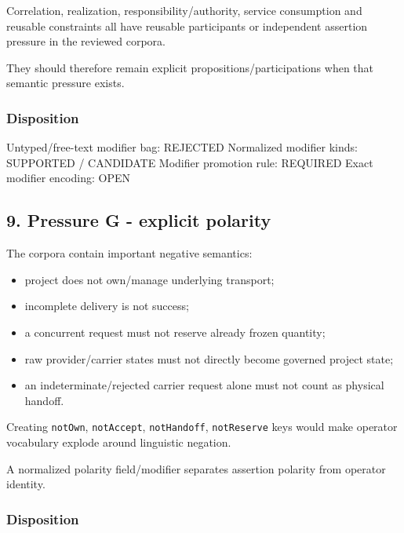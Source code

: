 \documentclass[
  10pt,
  letterpaper,
]{article}
\newenvironment{Shaded}{}{}
\newcommand{\NormalTok}[1]{#1}
\providecommand{\tightlist}{%
  \setlength{\itemsep}{0pt}\setlength{\parskip}{0pt}}
\begin{document}
Correlation, realization, responsibility/authority, service consumption
and reusable constraints all have reusable participants or independent
assertion pressure in the reviewed corpora.

They should therefore remain explicit propositions/participations when
that semantic pressure exists.

\subsubsection{Disposition}\label{disposition-4}

\begin{Shaded}
\begin{Highlighting}[]
\NormalTok{Untyped/free{-}text modifier bag: REJECTED}
\NormalTok{Normalized modifier kinds: SUPPORTED / CANDIDATE}
\NormalTok{Modifier promotion rule: REQUIRED}
\NormalTok{Exact modifier encoding: OPEN}
\end{Highlighting}
\end{Shaded}

\subsection{9. Pressure G - explicit
polarity}\label{pressure-g---explicit-polarity}

The corpora contain important negative semantics:

\begin{itemize}
\tightlist
\item
  project does not own/manage underlying transport;
\item
  incomplete delivery is not success;
\item
  a concurrent request must not reserve already frozen quantity;
\item
  raw provider/carrier states must not directly become governed project
  state;
\item
  an indeterminate/rejected carrier request alone must not count as
  physical handoff.
\end{itemize}

Creating \texttt{notOwn}, \texttt{notAccept}, \texttt{notHandoff},
\texttt{notReserve} keys would make operator vocabulary explode around
linguistic negation.

A normalized polarity field/modifier separates assertion polarity from
operator identity.

\subsubsection{Disposition}\label{disposition-5}
\end{document}
